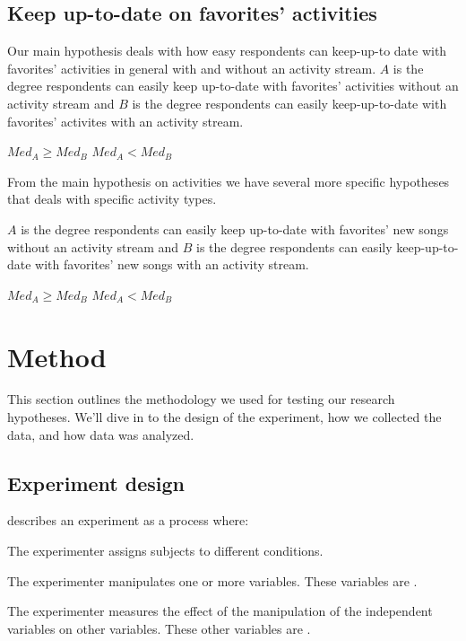 \subsection{Keep up-to-date on favorites' activities}

Our main hypothesis deals with how easy respondents can keep-up-to
date with favorites' activities in general with and without an 
activity stream.
$A$ is the degree respondents can easily keep up-to-date with
favorites' activities without an activity stream and $B$ is the degree
respondents can easily keep-up-to-date with favorites' activites  with
an activity stream.
\begin{items}
   $Med_A \geq Med_B$
   $Med_A < Med_B$
\end{items}

From the main hypothesis on activities we have several more specific
hypotheses that deals with specific activity types.

$A$ is the degree respondents can easily keep up-to-date with
favorites' new songs without an activity stream and $B$ is the degree
respondents can easily keep-up-to-date with favorites' new songs with
an activity stream.
\begin{items}
   $Med_A \geq Med_B$
   $Med_A < Med_B$
\end{items}

\section{Method}
\label{section:empirical.methodology}

This section outlines the methodology we used for testing our research
hypotheses. We'll dive in to the design of the experiment, how we collected
the data, and how data was analyzed.

\subsection{Experiment design}
\label{section:empirical.methodology.experiment.design}

\citet[]{robson93} describes an experiment as a process where:


\begin{items}
  \item The experimenter assigns subjects to different conditions.
  \item The experimenter manipulates one or more variables.
    These variables are .
  \item The experimenter measures the effect of the manipulation of
    the independent variables on other variables. These other
    variables are .
\end{items}

